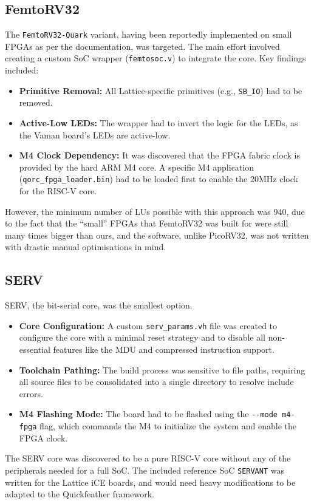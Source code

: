 \documentclass[conference]{IEEEtran}
\begin{document}
\subsection{FemtoRV32}
The \verb|FemtoRV32-Quark| variant, having been reportedly implemented on small FPGAs as per the documentation, was targeted. The main effort involved creating a custom SoC wrapper (\verb|femtosoc.v|) to integrate the core. Key findings included:
\begin{itemize}
    \item \textbf{Primitive Removal:} All Lattice-specific primitives (e.g., \verb|SB_IO|) had to be removed.
    \item \textbf{Active-Low LEDs:} The wrapper had to invert the logic for the LEDs, as the Vaman board's LEDs are active-low.
    \item \textbf{M4 Clock Dependency:} It was discovered that the FPGA fabric clock is provided by the hard ARM M4 core. A specific M4 application (\verb|qorc_fpga_loader.bin|) had to be loaded first to enable the 20MHz clock for the RISC-V core.
\end{itemize}
However, the minimum number of LUs possible with this approach was 940, due to the fact that the ``small'' FPGAs that FemtoRV32 was built for were still many times bigger than ours, and the software, unlike PicoRV32, was not written with drastic manual optimisations in mind.

\subsection{SERV}
SERV, the bit-serial core, was the smallest option.%
\begin{itemize}
    \item \textbf{Core Configuration:} A custom \verb|serv_params.vh| file was created to configure the core with a minimal reset strategy and to disable all non-essential features like the MDU and compressed instruction support.
    \item \textbf{Toolchain Pathing:} The build process was sensitive to file paths, requiring all source files to be consolidated into a single directory to resolve include errors.
    \item \textbf{M4 Flashing Mode:} The board had to be flashed using the \verb|--mode m4-fpga| flag, which commands the M4 to initialize the system and enable the FPGA clock.
\end{itemize}
The SERV core was discovered to be a pure RISC-V core without any of the peripherals needed for a full SoC. The included reference SoC \verb|SERVANT| was written for the Lattice iCE boards, and would need heavy modifications to be adapted to the Quickfeather framework.
\end{document}
